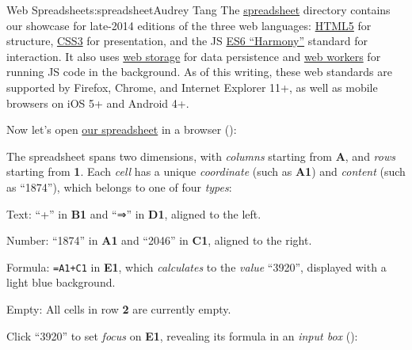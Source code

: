 \begin{aosachapter}{Web Spreadsheet}{s:spreadsheet}{Audrey Tang}
The
\href{https://github.com/audreyt/500lines/tree/master/spreadsheet/code}{spreadsheet}
directory contains our showcase for late-2014 editions of the three web
languages: \href{http://www.w3.org/TR/html5/}{HTML5} for structure,
\href{http://www.w3.org/TR/css3-ui/}{CSS3} for presentation, and the JS
\href{http://git.io/es6features}{ES6 ``Harmony''} standard for
interaction. It also uses
\href{http://www.whatwg.org/specs/web-apps/current-work/multipage/webstorage.html}{web
storage} for data persistence and
\href{http://www.whatwg.org/specs/web-apps/current-work/multipage/workers.html}{web
workers} for running JS code in the background. As of this writing,
these web standards are supported by Firefox, Chrome, and Internet
Explorer 11+, as well as mobile browsers on iOS 5+ and Android 4+.

Now let's open \href{http://audreyt.github.io/500lines/spreadsheet/}{our
spreadsheet} in a browser ():


\label{basic-concepts}

The spreadsheet spans two dimensions, with \emph{columns} starting from
\textbf{A}, and \emph{rows} starting from \textbf{1}. Each \emph{cell}
has a unique \emph{coordinate} (such as \textbf{A1}) and \emph{content}
(such as ``1874''), which belongs to one of four \emph{types}:

\begin{aosaitemize}

\item
  Text: ``+'' in \textbf{B1} and ``⇒'' in \textbf{D1}, aligned to the
  left.
\item
  Number: ``1874'' in \textbf{A1} and ``2046'' in \textbf{C1}, aligned
  to the right.
\item
  Formula: \texttt{=A1+C1} in \textbf{E1}, which \emph{calculates} to
  the \emph{value} ``3920'', displayed with a light blue background.
\item
  Empty: All cells in row \textbf{2} are currently empty.
\end{aosaitemize}

Click ``3920'' to set \emph{focus} on \textbf{E1}, revealing its formula
in an \emph{input box} ():



\end{aosachapter}

